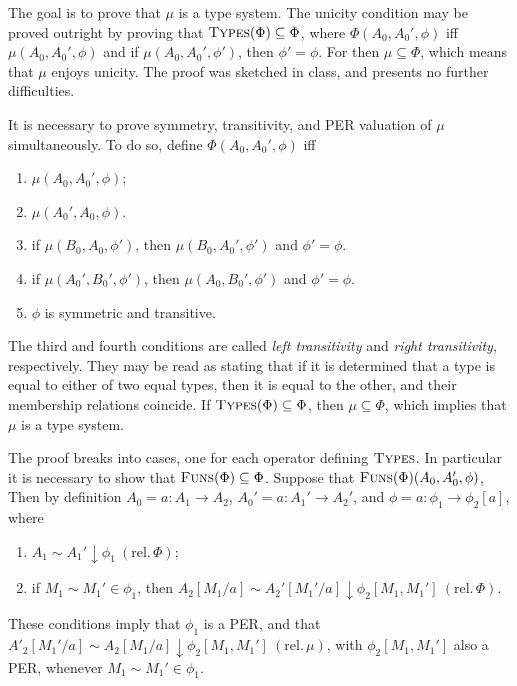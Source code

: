 \documentclass[11pt,twoside]{article}
\newcommand{\DFun}[3]{{#2}{:}{#1}\to{#3}}
\begin{document}
The goal is to prove that $\mu$ is a type system.  The unicity condition may be proved
outright by proving that $\textsc{Types}(\Phi)\subseteq\Phi$, where
$\Phi(A_{0},A_{0}',\phi)$ iff $\mu(A_{0},A_{0}',\phi)$ and if $\mu(A_{0},A_{0}',\phi')$, then
$\phi'=\phi$.  For then $\mu\subseteq\Phi$, which means that $\mu$ enjoys unicity.  The proof was sketched in
class, and presents no further difficulties.

It is necessary to prove symmetry, transitivity, and PER valuation of $\mu$ simultaneously.
To do so, define $\Phi(A_{0},A_{0}',\phi)$ iff
\begin{enumerate}
\item $\mu(A_{0},A_{0}',\phi)$;
\item $\mu(A_{0}',A_{0},\phi)$.
\item if $\mu(B_0,A_0,\phi')$, then $\mu(B_{0},A_{0}',\phi')$ and $\phi'=\phi$.
\item if $\mu(A_{0}',B_{0}',\phi')$, then $\mu(A_{0},B_{0}',\phi')$ and $\phi'=\phi$.
\item $\phi$ is symmetric and transitive.
\end{enumerate}
The third and fourth conditions are called \emph{left transitivity} and \emph{right
  transitivity}, respectively.  They may be read as stating that if it is determined that
a type is equal to either of two equal types, then it is equal to the other, and their
membership relations coincide.  If $\textsc{Types}(\Phi)\subseteq\Phi$, then $\mu\subseteq\Phi$, which implies that
$\mu$ is a type system.

\bigskip

\newcommand{\relto}[1]{(\text{rel.}\,#1)}

The proof breaks into cases, one for each operator defining $\textsc{Types}$.  In
particular it is necessary to show that $\textsc{Funs}(\Phi)\subseteq\Phi$.  Suppose that
$\textsc{Funs}(\Phi)(A_{0},A_{0}',\phi)$, Then by definition
$A_{0}=\DFun{A_{1}}{a}{A_{2}}$, $A_{0}'=\DFun{A_{1}'}{a}{A_{2}'}$, and
$\phi=\DFun{\phi_{1}}{a}{\phi_{2}[a]}$, where
\begin{enumerate}
\item $A_{1}\sim A_{1}'\downarrow\phi_{1} \ \relto{\Phi}$;
\item if $M_1\sim M_1'\in\phi_{1}$, then $A_{2}[M_1/a]\sim A_{2}'[M_1'/a]\downarrow\phi_{2}[M_1,M_1']\ \relto{\Phi}$.
\end{enumerate}
These conditions imply that $\phi_{1}$ is a PER, and that
$A'_{2}[M_1'/a]\sim A_{2}[M_1/a]\downarrow \phi_{2}[M_1,M_1']\ \relto{\mu}$, with
$\phi_{2}[M_1,M_1']$ also a PER, whenever $M_1\sim M_1'\in\phi_{1}$.
\end{document}
